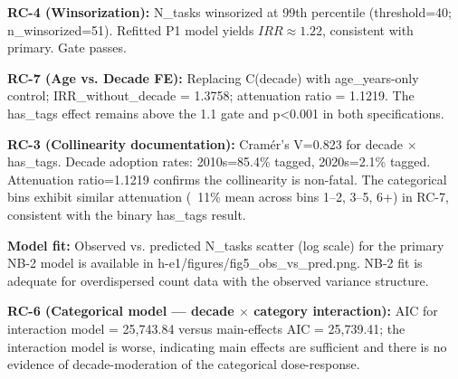 
\textbf{RC-4 (Winsorization):} N\_tasks winsorized at 99th percentile (threshold=40; n\_winsorized=51). Refitted P1 model yields $IRR\approx 1.22$, consistent with primary. Gate passes.

\textbf{RC-7 (Age vs. Decade FE):} Replacing C(decade) with age\_years-only control; IRR\_without\_decade = 1.3758; attenuation ratio = 1.1219. The has\_tags effect remains above the 1.1 gate and p<0.001 in both specifications.

\textbf{RC-3 (Collinearity documentation):} Cramér's V=0.823 for decade $\times$ has\_tags. Decade adoption rates: 2010s=85.4\% tagged, 2020s=2.1\% tagged. Attenuation ratio=1.1219 confirms the collinearity is non-fatal. The categorical bins exhibit similar attenuation (~11\% mean across bins 1--2, 3--5, 6+) in RC-7, consistent with the binary has\_tags result.

\textbf{Model fit:} Observed vs. predicted N\_tasks scatter (log scale) for the primary NB-2 model is available in h-e1/figures/fig5\_obs\_vs\_pred.png. NB-2 fit is adequate for overdispersed count data with the observed variance structure.

\textbf{RC-6 (Categorical model --- decade $\times$ category interaction):} AIC for interaction model = 25,743.84 versus main-effects AIC = 25,739.41; the interaction model is worse, indicating main effects are sufficient and there is no evidence of decade-moderation of the categorical dose-response.
